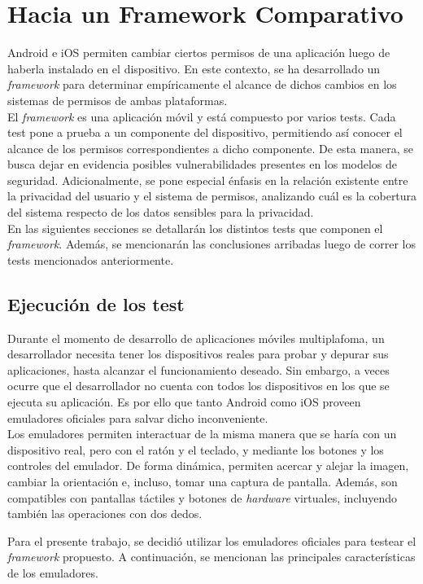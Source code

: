 \chapter{Hacia un Framework Comparativo}
Android e iOS permiten cambiar ciertos permisos de una aplicación luego de haberla instalado en el dispositivo. En este contexto, se ha desarrollado un \textit{framework} para determinar empíricamente el alcance de dichos cambios en los sistemas de permisos de ambas plataformas.\\

El \textit{framework} es una aplicación móvil y está compuesto por varios tests. Cada test pone a prueba a un componente del dispositivo, permitiendo así conocer el alcance de los permisos correspondientes a dicho componente. De esta manera, se busca dejar en evidencia posibles vulnerabilidades presentes en los modelos de seguridad. Adicionalmente, se pone especial énfasis en la relación existente entre la privacidad del usuario y el sistema de permisos, analizando cuál es la cobertura del sistema respecto de los datos sensibles para la privacidad.\\

En las siguientes secciones se detallarán los distintos tests que componen el \textit{framework}. Además, se mencionarán las conclusiones arribadas luego de correr los tests mencionados anteriormente.
\section{Ejecución de los test}
Durante el momento de desarrollo de aplicaciones móviles multiplafoma, un desarrollador necesita tener los dispositivos reales para probar y depurar sus aplicaciones, hasta alcanzar el funcionamiento deseado. Sin embargo, a veces ocurre que el desarrollador no cuenta con todos los dispositivos en los que se ejecuta su aplicación. Es por ello que tanto Android como iOS proveen emuladores oficiales para salvar dicho inconveniente.\\

Los emuladores permiten interactuar de la misma manera que se haría con un dispositivo real, pero con el ratón y el teclado, y mediante los botones y los controles del emulador. De forma dinámica, permiten acercar y alejar la imagen, cambiar la orientación e, incluso, tomar una captura de pantalla. Además, son compatibles con pantallas táctiles y botones de \emph{hardware} virtuales, incluyendo también las operaciones con dos dedos.

Para el presente trabajo, se decidió utilizar los emuladores oficiales para testear el \emph{framework} propuesto. A continuación, se mencionan las principales características de los emuladores.
